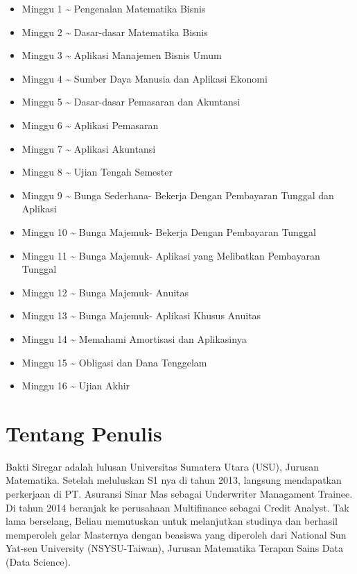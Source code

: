 \documentclass[
]{book}
\providecommand{\tightlist}{%
  \setlength{\itemsep}{0pt}\setlength{\parskip}{0pt}}
\begin{document}
\begin{itemize}
\tightlist
\item
  Minggu 1 \textasciitilde{} Pengenalan Matematika Bisnis
\item
  Minggu 2 \textasciitilde{} Dasar-dasar Matematika Bisnis
\item
  Minggu 3 \textasciitilde{} Aplikasi Manajemen Bisnis Umum
\item
  Minggu 4 \textasciitilde{} Sumber Daya Manusia dan Aplikasi Ekonomi
\item
  Minggu 5 \textasciitilde{} Dasar-dasar Pemasaran dan Akuntansi
\item
  Minggu 6 \textasciitilde{} Aplikasi Pemasaran
\item
  Minggu 7 \textasciitilde{} Aplikasi Akuntansi
\item
  Minggu 8 \textasciitilde{} Ujian Tengah Semester
\item
  Minggu 9 \textasciitilde{} Bunga Sederhana- Bekerja Dengan Pembayaran Tunggal dan Aplikasi
\item
  Minggu 10 \textasciitilde{} Bunga Majemuk- Bekerja Dengan Pembayaran Tunggal
\item
  Minggu 11 \textasciitilde{} Bunga Majemuk- Aplikasi yang Melibatkan Pembayaran Tunggal
\item
  Minggu 12 \textasciitilde{} Bunga Majemuk- Anuitas
\item
  Minggu 13 \textasciitilde{} Bunga Majemuk- Aplikasi Khusus Anuitas
\item
  Minggu 14 \textasciitilde{} Memahami Amortisasi dan Aplikasinya
\item
  Minggu 15 \textasciitilde{} Obligasi dan Dana Tenggelam
\item
  Minggu 16 \textasciitilde{} Ujian Akhir
\end{itemize}

\hypertarget{tentang-penulis}{%
\section*{Tentang Penulis}\label{tentang-penulis}}

Bakti Siregar adalah lulusan Universitas Sumatera Utara (USU), Jurusan Matematika. Setelah meluluskan S1 nya di tahun 2013, langsung mendapatkan perkerjaan di PT. Asuransi Sinar Mas sebagai Underwriter Managament Trainee. Di tahun 2014 beranjak ke perusahaan Multifinance sebagai Credit Analyst. Tak lama berselang, Beliau memutuskan untuk melanjutkan studinya dan berhasil memperoleh gelar Masternya dengan beasiswa yang diperoleh dari National Sun Yat-sen University (NSYSU-Taiwan), Jurusan Matematika Terapan Sains Data (Data Science).
\end{document}
